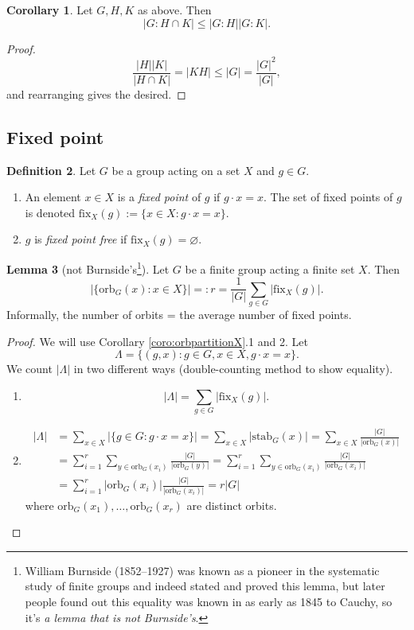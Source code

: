 \documentclass[a4paper]{article}
\newcommand{\orb}{\text{orb}}
\newcommand{\stab}{\text{stab}}
\newcommand{\fix}{\text{fix}}
\theoremstyle{definition}
\newtheorem{defn}{Definition}[subsection]
\newtheorem{lemma}[defn]{Lemma}
\newtheorem{coro}[defn]{Corollary}
\begin{document}
\begin{coro}
Let $G,H,K$ as above. Then
\[
|G:H\cap K|\leq |G:H||G:K|.
\]
\end{coro}
\begin{proof}
\[
\frac{|H||K|}{|H\cap K|}=|KH|\leq |G|=\frac{|G|^2}{|G|},
\]
and rearranging gives the desired.
\end{proof}

\subsection{Fixed point}
\begin{defn}
Let $G$ be a group acting on a set $X$ and $g\in G$.
\begin{enumerate}
\item An element $x\in X$ is a \textit{fixed point} of $g$ if $g\cdot x=x$. The set of fixed points of $g$ is denoted $\fix_X(g):=\{x\in X:g\cdot x=x\}$.
\item $g$ is \textit{fixed point free} if $\fix_X(g)=\varnothing$.
\end{enumerate}
\end{defn}

\begin{lemma}[not Burnside's\footnote{William Burnside (1852–1927) was known as a pioneer in the systematic study of finite groups and indeed stated and proved this lemma, but later people found out this equality was known in as early as 1845 to Cauchy, so it's \textit{a lemma that is not Burnside's}.}]
Let $G$ be a finite group acting a finite set $X$. Then
\[
|\{\orb_G(x):x\in X\}|=:r=\frac{1}{|G|}\sum_{g\in G}|\fix_X(g)|.
\]
Informally, the number of orbits = the average number of fixed points.
\end{lemma}
\begin{proof}
We will use Corollary \ref{coro:orbpartitionX}.1 and 2. Let
\[
\Lambda = \{(g,x):g\in G,x\in X, g\cdot x=x\}.
\]
We count $|\Lambda|$ in two different ways (double-counting method to show equality).
\begin{enumerate}
\item \[
|\Lambda|=\sum_{g\in G} |\fix_X(g)|.
\]
\item \[
\begin{aligned}
|\Lambda|&=\sum_{x\in X} |\{g\in G:g\cdot x=x\}|=\sum_{x\in X} |\stab_G(x)|=\sum_{x\in X} \frac{|G|}{|\orb_G(x)|}\\
&=\sum_{i=1}^r\sum_{y\in\orb_G(x_i)} \frac{|G|}{|\orb_G(y)|}=\sum_{i=1}^r\sum_{y\in\orb_G(x_i)} \frac{|G|}{|\orb_G(x_i)|} \\
&=\sum_{i=1}^r |\orb_G(x_i)| \frac{|G|}{|\orb_G(x_i)|}=r|G|
\end{aligned}
\]
where $\orb_G(x_1),\ldots,\orb_G(x_r)$ are distinct orbits.
\end{enumerate}
\end{proof}
\end{document}
